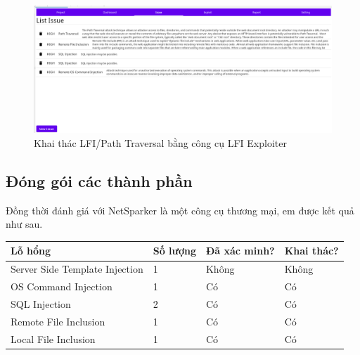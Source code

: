 \documentclass[./../main.tex]{subfiles}
\begin{document}
\begin{figure}[h!]
	\includegraphics[width=\linewidth]{./images/result_test.png}
	\caption{Khai thác LFI/Path Traversal bằng công cụ LFI Exploiter}
	\label{fig:result_test}
\end{figure}
\subsection{Đóng gói các thành phần}

Đồng thời đánh giá với NetSparker là một công cụ thương mại, em được kết quả như sau.
\begin{table}[]
	\begin{tabular}{|l|l|l|l|}
		\hline
		\textbf{Lỗ hổng}               & \textbf{Số lượng} & \textbf{Đã xác minh?} & \textbf{Khai thác?} \\ \hline
		Server Side Template Injection & 1                 & Không                 & Không               \\ \hline
		OS Command Injection           & 1                 & Có                    & Có                  \\ \hline
		SQL Injection                  & 2                 & Có                    & Có                  \\ \hline
		Remote File Inclusion          & 1                 & Có                    & Có                  \\ \hline
		Local File Inclusion           & 1                 & Có                    & Có                  \\ \hline
	\end{tabular}
\end{table}
\end{document}
